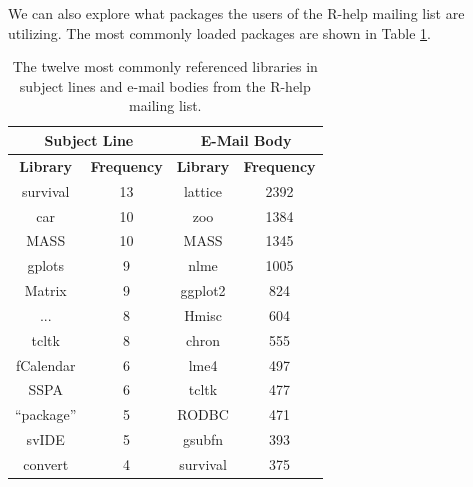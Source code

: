 \documentclass[12pt, a4paper, oneside]{amsart}
\begin{document}
We can also explore what packages the users of the R-help mailing list are utilizing.  The most commonly loaded packages are shown in Table \ref{table:allLibs}.

 \begin{table}[ht]
 \centering
 \begin{tabular}{|c|c||c|c|}
 \hline
\multicolumn{2}{|c||}{Subject Line} & \multicolumn{2}{|c|}{E-Mail Body}\\
\hline
\footnotesize{\textbf{Library}}& \footnotesize{\textbf{Frequency}} & \footnotesize{\textbf{Library}}& \footnotesize{\textbf{Frequency}}\\
\hline
survival & 13 & lattice & 2392 \\
car &10 & zoo & 1384\\
MASS & 10 & MASS & 1345\\
gplots & 9 & nlme & 1005\\
Matrix & 9 & ggplot2 & 824\\
... & 8 & Hmisc & 604\\
tcltk & 8 & chron & 555\\
fCalendar & 6 & lme4 & 497\\
SSPA & 6 & tcltk & 477\\
``package'' & 5 & RODBC & 471\\
svIDE & 5 & gsubfn & 393\\
convert & 4 & survival & 375\\
\hline
\end{tabular}
\caption{The twelve most commonly referenced libraries in subject lines and e-mail bodies from the R-help mailing list.}
\label{table:allLibs}
\end{table} 
\end{document}

